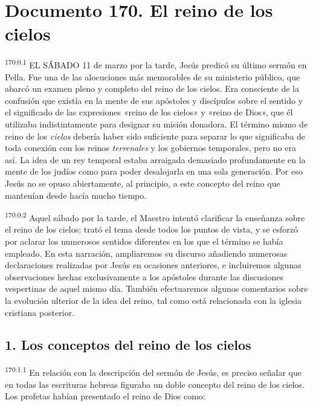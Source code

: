 \chapter{Documento 170. El reino de los cielos}
\par
\textsuperscript{170:0.1} EL SÁBADO 11 de marzo por la tarde, Jesús predicó su último sermón en Pella. Fue una de las alocuciones más memorables de su ministerio público, que abarcó un examen pleno y completo del reino de los cielos. Era consciente de la confusión que existía en la mente de sus apóstoles y discípulos sobre el sentido y el significado de las expresiones «reino de los cielos» y «reino de Dios», que él utilizaba indistintamente para designar su misión donadora. El término mismo de reino de los \textit{cielos} debería haber sido suficiente para separar lo que significaba de toda conexión con los reinos \textit{terrenales} y los gobiernos temporales, pero no era así. La idea de un rey temporal estaba arraigada demasiado profundamente en la mente de los judíos como para poder desalojarla en una sola generación. Por eso Jesús no se opuso abiertamente, al principio, a este concepto del reino que mantenían desde hacía mucho tiempo.

\par
\textsuperscript{170:0.2} Aquel sábado por la tarde, el Maestro intentó clarificar la enseñanza sobre el reino de los cielos; trató el tema desde todos los puntos de vista, y se esforzó por aclarar los numerosos sentidos diferentes en los que el término se había empleado. En esta narración, ampliaremos su discurso añadiendo numerosas declaraciones realizadas por Jesús en ocasiones anteriores, e incluiremos algunas observaciones hechas exclusivamente a los apóstoles durante las discusiones vespertinas de aquel mismo día. También efectuaremos algunos comentarios sobre la evolución ulterior de la idea del reino, tal como está relacionada con la iglesia cristiana posterior.

\section*{1. Los conceptos del reino de los cielos}
\par
\textsuperscript{170:1.1} En relación con la descripción del sermón de Jesús, es preciso señalar que en todas las escrituras hebreas figuraba un doble concepto del reino de los cielos. Los profetas habían presentado el reino de Dios como:

